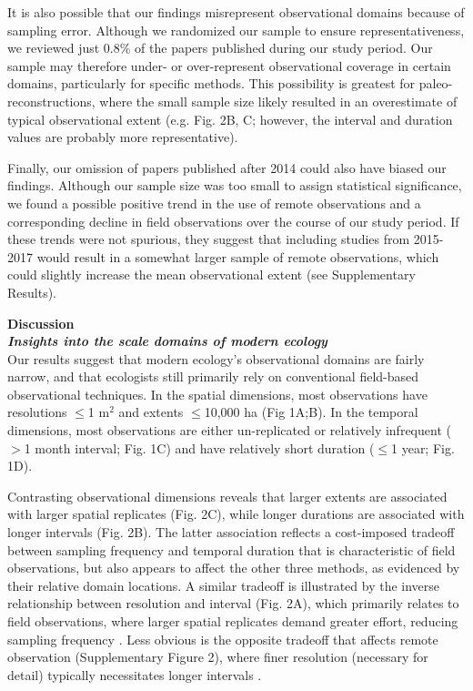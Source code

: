 \documentclass[12pt]{article}
\begin{document}
It is also possible that our findings misrepresent observational domains because of sampling error. Although we randomized our sample to ensure representativeness, we reviewed just 0.8\% of the papers published during our study period. Our sample may therefore under- or over-represent observational coverage in certain domains, particularly for specific methods. This possibility is greatest for paleo-reconstructions, where the small sample size likely resulted in an overestimate of typical observational extent (e.g. Fig. 2B, C; however, the interval and duration values are probably more representative). 

Finally, our omission of papers published after 2014 could also have biased our findings. Although our sample size was too small to assign statistical significance, we found a possible positive trend in the use of remote observations and a corresponding decline in field observations over the course of our study period. If these trends were not spurious, they suggest that including studies from 2015-2017 would result in a somewhat larger sample of remote observations, which could slightly increase the mean observational extent (see Supplementary Results). 

\vspace{10pt}
\noindent \textbf{Discussion}
\vspace{5pt}
\\
\noindent \textbf{\emph{Insights into the scale domains of modern ecology}}\\
Our results suggest that modern ecology's observational domains are fairly narrow, and that ecologists still primarily rely on conventional field-based observational techniques. In the spatial dimensions, most observations have resolutions $\leq$1 m$^2$ and extents $\leq$10,000 ha (Fig 1A;B). In the temporal dimensions, most observations are either un-replicated or relatively infrequent ($>$1 month interval; Fig. 1C) and have relatively short duration ($\leq$1 year; Fig. 1D). 

Contrasting observational dimensions reveals that larger extents are associated with larger spatial replicates (Fig. 2C), while longer durations are associated with longer intervals (Fig. 2B). The latter association reflects a cost-imposed tradeoff between sampling frequency and temporal duration that is characteristic of field observations, but also appears to affect the other three methods, as evidenced by their relative domain locations. A similar tradeoff is illustrated by the inverse relationship between resolution and interval (Fig. 2A), which primarily relates to field observations, where larger spatial replicates demand greater effort, reducing sampling frequency \cite{kareiva_spatial_1988}. Less obvious is the opposite tradeoff that affects remote observation (Supplementary Figure 2), where finer resolution (necessary for detail) typically necessitates longer intervals \cite{estes_platform_2016}.   
\end{document}
